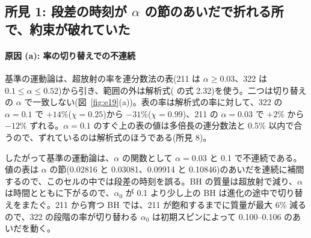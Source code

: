 \subsection{所見 1: 段差の時刻が $\alpha$ の節のあいだで折れる所で、約束が破れていた}

\paragraph{原因 (a): 率の切り替えでの不連続}
基準の運動論は、超放射の率を連分数法の表(211 は $\alpha\ge0.03$、322 は $0.1\le\alpha\le0.52$)から引き、範囲の外は解析式( の式 2.32)を使う。二つは切り替えの $\alpha$ で一致しない(図~\ref{fig:e19}(a))。表の率は解析式の率に対して、322 の $\alpha=0.1$ で $+14\%$($\chi=0.25$)から $-31\%$($\chi=0.99$)、211 の $\alpha=0.03$ で $+2\%$ から $-12\%$ ずれる。$\alpha=0.1$ のすぐ上の表の値は多倍長の連分数法と 0.5\% 以内で合うので、ずれているのは解析式のほうである(所見 8)。

したがって基準の運動論は、$\alpha$ の関数として $\alpha=0.03$ と 0.1 で不連続である。値の表は $\alpha$ の節(0.02816 と 0.03081、0.09914 と 0.10846)のあいだを連続に補間するので、このセルの中では段差の時刻を誤る。BH の質量は超放射で減り、$\alpha$ は時間とともに下がるので、$\alpha_0$ が 0.1 より少し上の BH は進化の途中で切り替えをまたぐ。211 から育つ BH では、211 が飽和するまでに質量が最大 6\% 減るので、322 の段階の率が切り替わる $\alpha_0$ は初期スピンによって 0.100--0.106 のあいだを動く。

